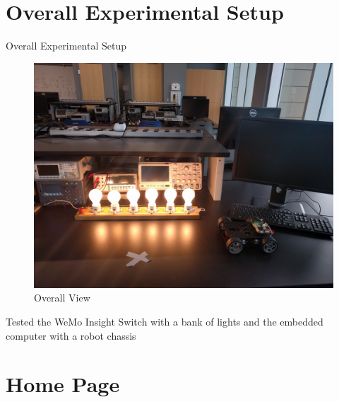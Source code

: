 \documentclass{beamer}
\begin{document}
\section{Overall Experimental Setup}
\begin{frame}{Overall Experimental Setup}{} %
    \begin{figure}
        \centering
        \includegraphics[scale=0.04]{figs/overallView.jpg}
        \caption{Overall View}
        \label{fig:my_label}
    \end{figure}
    Tested the WeMo Insight Switch with a bank of lights and the embedded computer with a robot chassis

\end{frame}
\section{Home Page}
\end{document}
